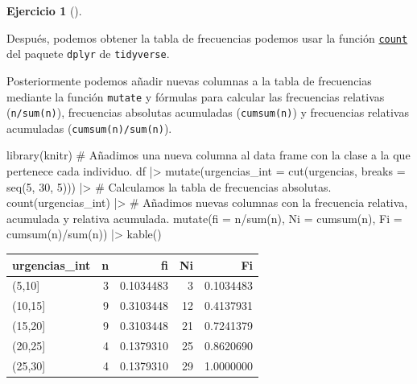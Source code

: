 \documentclass[
  spanish,
  a4paper,
]{scrreport}
\newenvironment{Shaded}{\begin{snugshade}}{\end{snugshade}}
\newcommand{\AttributeTok}[1]{\textcolor[rgb]{0.40,0.45,0.13}{#1}}
\newcommand{\CommentTok}[1]{\textcolor[rgb]{0.37,0.37,0.37}{#1}}
\newcommand{\DecValTok}[1]{\textcolor[rgb]{0.68,0.00,0.00}{#1}}
\newcommand{\FunctionTok}[1]{\textcolor[rgb]{0.28,0.35,0.67}{#1}}
\newcommand{\NormalTok}[1]{\textcolor[rgb]{0.00,0.23,0.31}{#1}}
\newcommand{\SpecialCharTok}[1]{\textcolor[rgb]{0.37,0.37,0.37}{#1}}
\theoremstyle{definition}
\newtheorem{exercise}{Ejercicio}[chapter]
\theoremstyle{remark}
\begin{document}
\begin{exercise}[]
\begin{enumerate}
\begin{tcolorbox}
  Después, podemos obtener la tabla de frecuencias podemos usar la
  función
  \href{https://aprendeconalf.es/manual-r/06-preprocesamiento.html\#conteo-del-n\%C3\%BAmero-de-observaciones}{\texttt{count}}
  del paquete \texttt{dplyr} de \texttt{tidyverse}.

  Posteriormente podemos añadir nuevas columnas a la tabla de
  frecuencias mediante la función \texttt{mutate} y fórmulas para
  calcular las frecuencias relativas (\texttt{n/sum(n)}), frecuencias
  absolutas acumuladas (\texttt{cumsum(n)}) y frecuencias relativas
  acumuladas (\texttt{cumsum(n)/sum(n)}).

\begin{Shaded}
\begin{Highlighting}[]
\FunctionTok{library}\NormalTok{(knitr)}
\CommentTok{\# Añadimos una nueva columna al data frame con la clase a la que pertenece cada individuo.}
\NormalTok{df }\SpecialCharTok{|\textgreater{}} \FunctionTok{mutate}\NormalTok{(}\AttributeTok{urgencias\_int =} \FunctionTok{cut}\NormalTok{(urgencias, }\AttributeTok{breaks =} \FunctionTok{seq}\NormalTok{(}\DecValTok{5}\NormalTok{, }\DecValTok{30}\NormalTok{, }\DecValTok{5}\NormalTok{))) }\SpecialCharTok{|\textgreater{}} 
    \CommentTok{\# Calculamos la tabla de frecuencias absolutas.}
    \FunctionTok{count}\NormalTok{(urgencias\_int) }\SpecialCharTok{|\textgreater{}}
    \CommentTok{\# Añadimos nuevas columnas con la frecuencia relativa, acumulada y relativa acumulada.}
    \FunctionTok{mutate}\NormalTok{(}\AttributeTok{fi =}\NormalTok{ n}\SpecialCharTok{/}\FunctionTok{sum}\NormalTok{(n), }\AttributeTok{Ni =} \FunctionTok{cumsum}\NormalTok{(n), }\AttributeTok{Fi =} \FunctionTok{cumsum}\NormalTok{(n)}\SpecialCharTok{/}\FunctionTok{sum}\NormalTok{(n)) }\SpecialCharTok{|\textgreater{}}
    \FunctionTok{kable}\NormalTok{()}
\end{Highlighting}
\end{Shaded}

  \begin{longtable}[]{@{}lrrrr@{}}
  \toprule\noalign{}
  urgencias\_int & n & fi & Ni & Fi \\
  \midrule\noalign{}
  \endhead
  \bottomrule\noalign{}
  \endlastfoot
  (5,10{]} & 3 & 0.1034483 & 3 & 0.1034483 \\
  (10,15{]} & 9 & 0.3103448 & 12 & 0.4137931 \\
  (15,20{]} & 9 & 0.3103448 & 21 & 0.7241379 \\
  (20,25{]} & 4 & 0.1379310 & 25 & 0.8620690 \\
  (25,30{]} & 4 & 0.1379310 & 29 & 1.0000000 \\
  \end{longtable}


\end{tcolorbox}
\end{enumerate}
\end{exercise}
\end{document}
